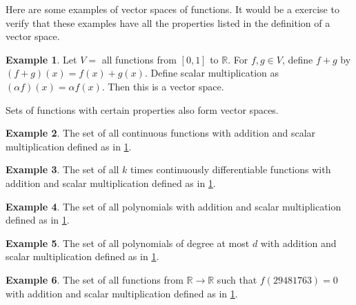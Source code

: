 \documentclass[12pt,reqno]{amsart}
\def\R{\mathbb{R}}
\theoremstyle{definition}
\newtheorem{example}{Example}[section]
\begin{document}
Here are some examples of vector spaces of functions. It would be a
exercise to verify that these examples have all the properties listed
in the definition of a vector space. 
\begin{example} \label{ex:funcSpace}
  Let $V = $ all functions from $[0,1]$ to $\R$. For $f, g \in V$,
  define $f + g$ by $(f+g)(x) = f(x) + g(x)$. Define scalar
  multiplication as $(\alpha f)(x) = \alpha f(x)$. Then this is a
  vector space. 
\end{example}
Sets of functions with certain properties also form vector spaces. 
\begin{example}
  The set of all continuous functions with addition and scalar
  multiplication defined as in \ref{ex:funcSpace}.
\end{example}
\begin{example}
  The set of all $k$ times continuously differentiable functions with
  addition and scalar multiplication defined as in \ref{ex:funcSpace}.
\end{example}
\begin{example}
  The set of all polynomials with addition and scalar
  multiplication defined as in \ref{ex:funcSpace}.
\end{example}
\begin{example} 
  The set of all polynomials of degree at most $d$ with addition and scalar
  multiplication defined as in \ref{ex:funcSpace}.
\end{example}
\begin{example}
  The set of all functions from $\R \to \R$ such that $f(29481763) =
  0$ with addition and scalar multiplication defined as in
  \ref{ex:funcSpace}.
\end{example}
\end{document}
